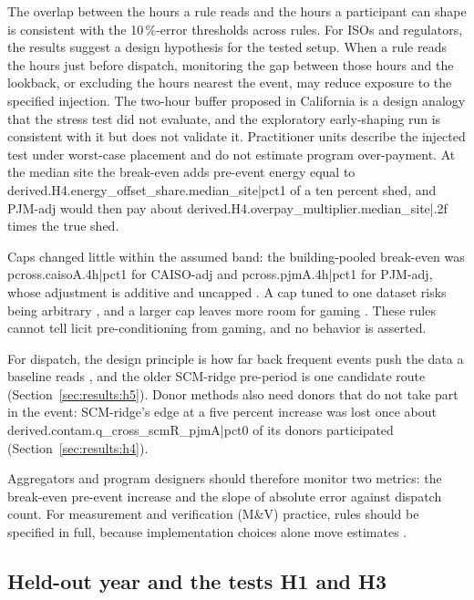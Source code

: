 The overlap between the hours a rule reads and the hours a participant can shape is consistent with the 10\,\%-error thresholds across rules. For ISOs and regulators, the results suggest a design hypothesis for the tested setup. When a rule reads the hours just before dispatch, monitoring the gap between those hours and the lookback, or excluding the hours nearest the event, may reduce exposure to the specified injection. The two-hour buffer proposed in California \citep{caiso_bawg2017} is a design analogy that the stress test did not evaluate, and the exploratory early-shaping run is consistent with it but does not validate it. Practitioner units describe the injected test under worst-case placement and do not estimate program over-payment. At the median site the break-even adds pre-event energy equal to {{derived.H4.energy_offset_share.median_site|pct1}} of a ten percent shed, and PJM-adj would then pay about {{derived.H4.overpay_multiplier.median_site|.2f}} times the true shed.

Caps changed little within the assumed band: the building-pooled break-even was {{pcross.caisoA.4h|pct1}} for CAISO-adj and {{pcross.pjmA.4h|pct1}} for PJM-adj, whose adjustment is additive and uncapped \citep{pjm_manual11,pjm_attk}. A cap tuned to one dataset risks being arbitrary \citep{granderson2021}, and a larger cap leaves more room for gaming \citep{gabaldon2021}. These rules cannot tell licit pre-conditioning from gaming, and no behavior is asserted.

For dispatch, the design principle is how far back frequent events push the data a baseline reads \citep{enernoc2009naesb,caiso_bawg2017}, and the older SCM-ridge pre-period is one candidate route (Section~\ref{sec:results:h5}). Donor methods also need donors that do not take part in the event: SCM-ridge's edge at a five percent increase was lost once about {{derived.contam.q_cross_scmR_pjmA|pct0}} of its donors participated (Section~\ref{sec:results:h4}).

Aggregators and program designers should therefore monitor two metrics: the break-even pre-event increase and the slope of absolute error against dispatch count. For measurement and verification (M\&V) practice, rules should be specified in full, because implementation choices alone move estimates \citep{addy2015}.

\subsection{Held-out year and the tests H1 and H3}\label{sec:discussion:h1h3}

